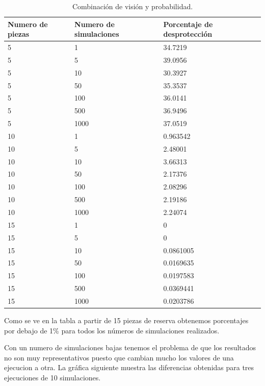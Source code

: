 \documentclass[]{article}
\begin{document}
 \begin{table}[H]
	\begin{center}
		\resizebox{12.5cm}{!} {
			\begin{tabular}{|l|l|l|}
				\hline
				Numero de piezas & Numero de simulaciones & Porcentaje de desprotección \\
				\hline \hline
				5 & 1 & 34.7219
				\\ \hline
				5 & 5 & 39.0956
				\\ \hline
				5 & 10 & 30.3927
				\\ \hline
				5 & 50 & 35.3537
				\\ \hline
				5 & 100 & 36.0141
				\\ \hline
				5 & 500 & 36.9496
				\\ \hline
				5 & 1000 & 37.0519
				\\ \hline
				10 & 1 & 0.963542
				\\ \hline
				10 & 5 & 2.48001
				\\ \hline
				10 & 10 & 3.66313
				\\ \hline 
				10 & 50 & 2.17376
				\\ \hline
				10 & 100 & 2.08296
				\\ \hline
				10 & 500 & 2.19186
				\\ \hline
				10 & 1000 & 2.24074
				\\ \hline
				15 & 1 & 0
				\\ \hline
				15 & 5 & 0
				\\ \hline
				15 & 10 & 0.0861005
				\\ \hline
				15 & 50 & 0.0169635
				\\ \hline
				15 & 100 & 0.0197583
				\\ \hline
				15 & 500 & 0.0369441
				\\ \hline
				15 & 1000 & 0.0203786
				\\ \hline
				
			\end{tabular}
		}
		\caption{Combinación de visión y probabilidad.}
		\label{tabla:sencilla}
	\end{center}
\end{table}
Como se ve en la tabla a partir de 15 piezas de reserva obtenemos porcentajes por debajo de 1\% para todos los números de simulaciones realizados.

Con un numero de simulaciones bajas tenemos el problema de que los resultados no son muy representativos puesto que cambian mucho los valores de una ejecucion a otra. La gráfica siguiente muestra las diferencias obtenidas para tres ejecuciones de 10 simulaciones.
\end{document}
